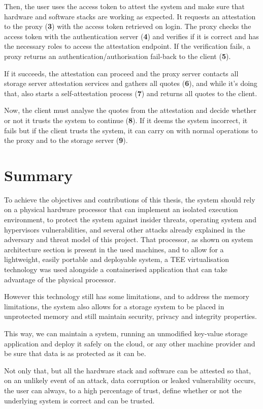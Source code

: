 Then, the user uses the access token to attest the system and make sure that hardware and software stacks are working as expected. It requests an attestation to the proxy (\textbf{3}) with the access token retrieved on login. The proxy checks the access token with the authentication server (\textbf{4}) and verifies if it is correct and has the necessary roles to access the attestation endpoint. If the verification fails, a proxy returns an authentication/authorisation fail-back to the client (\textbf{5}). 

If it succeeds, the attestation can proceed and the proxy server contacts all storage server attestation services and gathers all quotes (\textbf{6}), and while it's doing that, also starts a self-attestation process (\textbf{7}) and returns all quotes to the client. 

Now, the client must analyse the quotes from the attestation and decide whether or not it trusts the system to continue (\textbf{8}). If it deems the system incorrect, it fails but if the client trusts the system, it can carry on with normal operations to the proxy and to the storage server (\textbf{9}).

\section{Summary}
\label{sec:chapter3_summary}

To achieve the objectives and contributions of this thesis, the system should rely on a physical hardware processor that can implement an isolated execution environment, to protect the system against insider threats, operating system and hypervisors vulnerabilities, and several other attacks already explained in the adversary and threat model of this project. That processor, as shown on system architecture section is present in the used machines, and to allow for a lightweight, easily portable and deployable system, a TEE virtualisation technology was used alongside a containerised application that can take advantage of the physical processor.

However this technology still has some limitations, and to address the memory limitations, the system also allows for a storage system to be placed in unprotected memory and still maintain security, privacy and integrity properties.

This way, we can maintain a system, running an unmodified key-value storage application and deploy it safely on the cloud, or any other machine provider and be sure that data is as protected as it can be.

Not only that, but all the hardware stack and software can be attested so that, on an unlikely event of an attack, data corruption or leaked vulnerability occurs, the user can always, to a high percentage of trust, define whether or not the underlying system is correct and can be trusted.